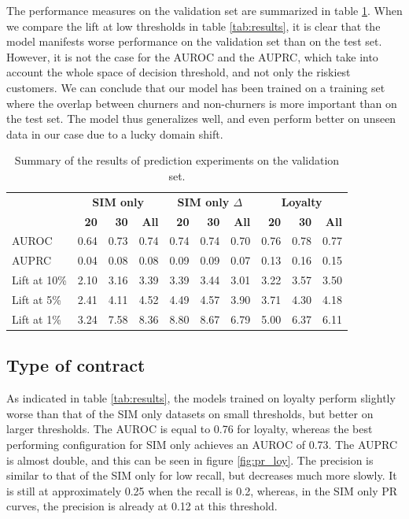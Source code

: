 The performance measures on the validation set are summarized in table
\ref{tab:results_valid}. When we compare the lift at low thresholds in table
\ref{tab:results}, it is clear that the model manifests worse performance on the
validation set than on the test set. However, it is not the case for the AUROC
and the AUPRC, which take into account the whole space of decision threshold,
and not only the riskiest customers. We can conclude that our model has been
trained on a training set where the overlap between churners and non-churners is
more important than on the test set. The model thus generalizes well, and even
perform better on unseen data in our case due to a lucky domain shift.

\begin{table}
    \centering
    \begin{tabular}{lrrrrrrrrr}
        \toprule
        & \multicolumn{3}{c}{\textbf{SIM only}}
        & \multicolumn{3}{c}{\textbf{SIM only $\Delta$}}
        & \multicolumn{3}{c}{\textbf{Loyalty}} \\
        \cmidrule(l){2-4} \cmidrule(l){5-7} \cmidrule(l){8-10}
        & \textbf{20} & \textbf{30} & \textbf{All} & \textbf{20} & \textbf{30} &
        \textbf{All} & \textbf{20} & \textbf{30} & \textbf{All} \\
        \midrule
        AUROC & 0.64 & 0.73 & 0.74 & 0.74 & 0.74 & 0.70 & 0.76 & 0.78 & 0.77 \\
        AUPRC & 0.04 & 0.08 & 0.08 & 0.09 & 0.09 & 0.07 & 0.13 & 0.16 & 0.15 \\
        Lift at 10\%  & 2.10 & 3.16 & 3.39 & 3.39 & 3.44 & 3.01 & 3.22 & 3.57 & 3.50 \\
        Lift at  5\%  & 2.41 & 4.11 & 4.52 & 4.49 & 4.57 & 3.90 & 3.71 & 4.30 & 4.18 \\
        Lift at  1\%  & 3.24 & 7.58 & 8.36 & 8.80 & 8.67 & 6.79 & 5.00 & 6.37 & 6.11 \\
        \bottomrule
    \end{tabular}
    \caption{Summary of the results of prediction experiments on the validation
    set.}
    \label{tab:results_valid}
\end{table}

\subsection{Type of contract}

As indicated in table \ref{tab:results}, the models trained on loyalty perform
slightly worse than that of the SIM only datasets on small thresholds, but better
on larger thresholds. The AUROC is equal to 0.76 for loyalty, whereas the best
performing configuration for SIM only achieves an AUROC of 0.73. The AUPRC is
almost double, and this can be seen in figure \ref{fig:pr_loy}. The
precision is similar to that of the SIM only for low recall, but decreases much
more slowly. It is still at approximately 0.25 when the recall is 0.2, whereas,
in the SIM only PR curves, the precision is already at 0.12 at this threshold.

